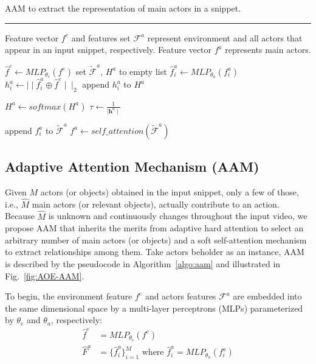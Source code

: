 \documentclass[sn-mathphys]{sn-jnl}
\theoremstyle{thmstyleone}\newtheorem{theorem}{Theorem}\newtheorem{proposition}[theorem]{Proposition}
\theoremstyle{thmstyletwo}\newtheorem{example}{Example}\newtheorem{remark}{Remark}
\theoremstyle{thmstylethree}\newtheorem{definition}{Definition}
\begin{document}
\begin{algorithm}[t]
\caption{AAM to extract the representation of main actors in a snippet.}
\label{algo:aam}
\hrule
\begin{algorithmic}[1]
\algrenewcommand{}
\algrenewcommand{}
\Require Feature vector $f^e$ and features set $\mathcal{F}^a$ represent environment and all actors that appear in an input snippet, respectively.
\Ensure Feature vector $f^a$ represents main actors.

\State $\hat{f}^e \gets MLP_{\theta_e}(f^e)$ \State set $\tilde{\mathcal{F}}^a$, $H^a$ to empty list 
    \State $\hat{f}^a_i \gets MLP_{\theta_a}(f^a_i)$ \State $h^a_i \gets \mid\mid \hat{f}^a_i \oplus \hat{f}^e \mid\mid_2$   
    \State append $h^a_i$ to $H^a$
\EndFor

\State $H^a \gets softmax(H^a)$ \State $\tau \gets \frac{1}{\mid\textbf{h}^a\mid}$ 

        \State append $f^a_i$ to $\tilde{\mathcal{F}}^a$ \EndIf
\EndFor
\State $f^a \gets self\_attention(\tilde{\mathcal{F}}^a)$ \end{algorithmic}
\end{algorithm}

\subsection{Adaptive Attention Mechanism (AAM)}
\label{sec:aam}

Given $M$ actors (or objects) obtained in the input snippet, only a few of those, i.e., $\hat{M}$ main actors (or relevant objects), actually contribute to an action. Because $\hat{M}$ is unknown and continuously changes throughout the input video, we propose AAM that inherits the merits from adaptive hard attention \cite{adahard_eccv2018} to select an arbitrary number of main actors (or objects) and a soft self-attention mechanism \cite{attention_is_all_you_need} to extract relationships among them. Take actors beholder as an instance, AAM is described by the pseudocode in Algorithm~\ref{algo:aam} and illustrated in Fig.~\ref{fig:AOE-AAM}.


To begin, the environment feature $f^{e}$ and actors features $\mathcal{F}^{a}$ are embedded into the same dimensional space by a multi-layer perceptrons (MLPs) parameterized by $\theta_e$ and $\theta_a$, respectively: \begin{align}
\hat{f}^{e} &= MLP_{\theta_e}(f^e) \label{eq:env_mlp}\\
\hat{F}^{a} &= \{\hat{f}^{a}_i\}_{i=1}^{M} \text{ where } \hat{f}^{a}_i = MLP_{\theta_a}(f^a_i)
\end{align}
\end{document}
